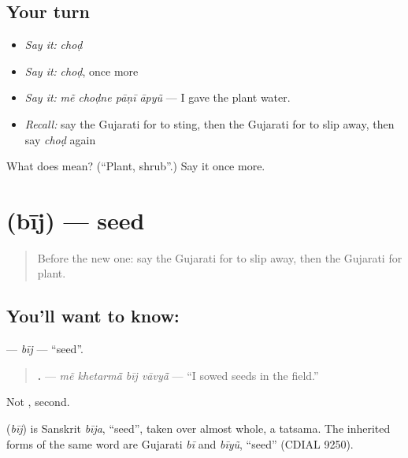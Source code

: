 \subsection*{Your turn}
\begin{itemize}
\raggedright
  \item \emph{Say it:} \emph{choḍ}
  \item \emph{Say it:} \emph{choḍ}, once more
  \item \emph{Say it:} \emph{mẽ choḍne pāṇī āpyũ} — I gave the plant water.
  \item \emph{Recall:} say the Gujarati for to sting, then the Gujarati for to slip away, then say \emph{choḍ} again
\end{itemize}

\begin{tcolorbox}[breakable,colback=teal!4,colframe=teal!35!black,title={Before you move on}]
What does  mean? (\textquotedblleft{}Plant, shrub\textquotedblright{}.) Say it once more.
\end{tcolorbox}
\section[\texorpdfstring{\gu{બીજ} (bīj)}{બીજ (bīj)}]{ (bīj) — seed}

\label{lesson:GU-C240-bij}



\begin{quote}
Before the new one: say the Gujarati for to slip away, then the Gujarati for plant.
\end{quote}

\subsection*{You'll want to know: }
\textbf{} — \emph{bīj} — \textquotedblleft{}seed\textquotedblright{}.

\begin{quote}
\textbf{   .} — \emph{mẽ khetarmā̃ bīj vāvyā̃} — \textquotedblleft{}I sowed seeds in the field.\textquotedblright{}
\end{quote}

Not \textbf{}, second.

\begin{cousinweb}
\textbf{} (\emph{bīj}) is Sanskrit \emph{bīja}, \textquotedblleft{}seed\textquotedblright{}, taken over almost whole, a tatsama. The inherited forms of the same word are Gujarati \emph{bī} and \emph{bīyũ}, \textquotedblleft{}seed\textquotedblright{} (CDIAL 9250).
\end{cousinweb}

